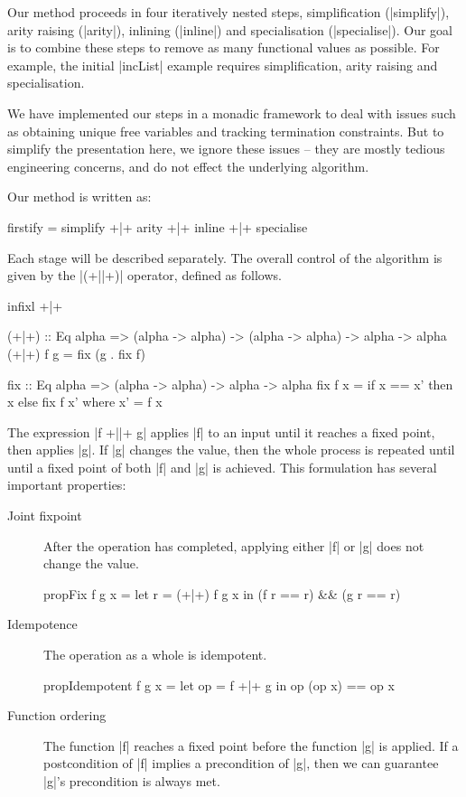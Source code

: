 Our method proceeds in four iteratively nested steps, simplification (|simplify|), arity raising (|arity|), inlining (|inline|) and specialisation (|specialise|). Our goal is to combine these steps to remove as many functional values as possible. For example, the initial |incList| example requires simplification, arity raising and specialisation.

We have implemented our steps in a monadic framework to deal with issues such as obtaining unique free variables and tracking termination constraints. But to simplify the presentation here, we ignore these issues -- they are mostly tedious engineering concerns, and do not effect the underlying algorithm.

Our method is written as:

\begin{code}
firstify = simplify +|+ arity +|+ inline +|+ specialise
\end{code}

Each stage will be described separately. The overall control of the algorithm is given by the |(+||+)| operator, defined as follows.

\begin{code}
infixl +|+

(+|+) :: Eq alpha => (alpha -> alpha) -> (alpha -> alpha) -> alpha -> alpha
(+|+) f g = fix (g . fix f)

fix :: Eq alpha => (alpha -> alpha) -> alpha -> alpha
fix f x = if x == x' then x else fix f x'
    where x' = f x
\end{code}

The expression |f +||+ g| applies |f| to an input until it reaches a fixed point, then applies |g|. If |g| changes the value, then the whole process is repeated until until a fixed point of both |f| and |g| is achieved. This formulation has several important properties:

\begin{description}
\item[Joint fixpoint] After the operation has completed, applying either |f| or |g| does not change the value.

\begin{code}
propFix f g x = let r = (+|+) f g x in (f r == r) && (g r == r)
\end{code}

\item[Idempotence] The operation as a whole is idempotent.

\begin{code}
propIdempotent f g x = let op = f +|+ g in op (op x) == op x
\end{code}

\item[Function ordering] The function |f| reaches a fixed point before the function |g| is applied. If a postcondition of |f| implies a precondition of |g|, then we can guarantee |g|'s precondition is always met.
\end{description}

